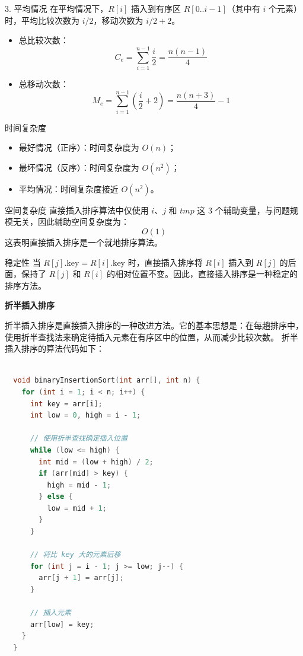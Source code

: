\documentclass[lang=cn,newtx,10pt,scheme=chinese]{elegantbook}
\begin{document}
3. 平均情况  
   在平均情况下，$R[i]$ 插入到有序区 $R[0..i-1]$（其中有 $i$ 个元素）时，平均比较次数为 $i/2$，移动次数为 $i/2 + 2$。  
   \begin{itemize}
     \item 总比较次数：  
       \[
       C_e = \sum_{i=1}^{n-1} \frac{i}{2} = \frac{n(n-1)}{4}
       \]
     \item 总移动次数：  
       \[
       M_e = \sum_{i=1}^{n-1} \left(\frac{i}{2} + 2\right) = \frac{n(n+3)}{4} - 1
       \]
   \end{itemize}

时间复杂度  
\begin{itemize}
  \item 最好情况（正序）：时间复杂度为 $O(n)$；
  \item 最坏情况（反序）：时间复杂度为 $O(n^2)$；
  \item 平均情况：时间复杂度接近 $O(n^2)$。
\end{itemize}

空间复杂度  
直接插入排序算法中仅使用 $i$、$j$ 和 $tmp$ 这 3 个辅助变量，与问题规模无关，因此辅助空间复杂度为：
\[
O(1)
\]
这表明直接插入排序是一个就地排序算法。

稳定性  
当 $R[j].\text{key} = R[i].\text{key}$ 时，直接插入排序将 $R[i]$ 插入到 $R[j]$ 的后面，保持了 $R[j]$ 和 $R[i]$ 的相对位置不变。因此，直接插入排序是一种稳定的排序方法。

\textbf{折半插入排序}

折半插入排序是直接插入排序的一种改进方法。它的基本思想是：在每趟排序中，使用折半查找法来确定待插入元素在有序区中的位置，从而减少比较次数。
折半插入排序的算法代码如下：
\begin{lstlisting}[language=C++, caption=折半插入排序的算法代码]

  void binaryInsertionSort(int arr[], int n) {
    for (int i = 1; i < n; i++) {
      int key = arr[i];
      int low = 0, high = i - 1;

      // 使用折半查找确定插入位置
      while (low <= high) {
        int mid = (low + high) / 2;
        if (arr[mid] > key) {
          high = mid - 1;
        } else {
          low = mid + 1;
        }
      }

      // 将比 key 大的元素后移
      for (int j = i - 1; j >= low; j--) {
        arr[j + 1] = arr[j];
      }

      // 插入元素
      arr[low] = key;
    }
  }

  \end{lstlisting}
\end{document}
